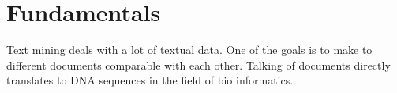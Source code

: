 \section{Fundamentals}

Text mining deals with a lot of textual data. One of the goals is to make to different documents comparable with each other. Talking of documents directly translates to DNA sequences in the field of bio informatics.\\




